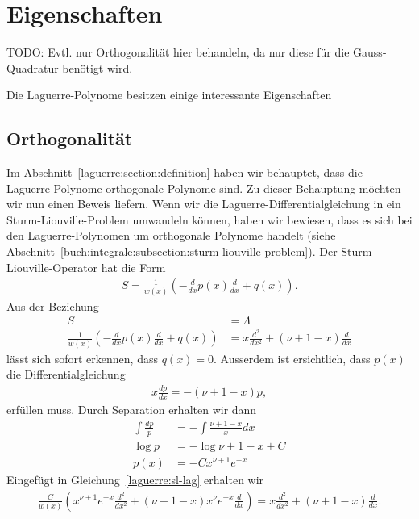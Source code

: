 %
%
%
\section{Eigenschaften
  \label{laguerre:section:eigenschaften}}
{
\large \color{red}
TODO:
Evtl. nur Orthogonalität hier behandeln, da nur diese für die Gauss-Quadratur
benötigt wird.
}

Die Laguerre-Polynome besitzen einige interessante Eigenschaften

\subsection{Orthogonalität
  \label{laguerre:subsection:orthogonal}}
Im Abschnitt~\ref{laguerre:section:definition} haben wir behauptet,
dass die Laguerre-Polynome orthogonale Polynome sind.
Zu dieser Behauptung möchten wir nun einen Beweis liefern.
Wenn wir die Laguerre\--Differentialgleichung in ein
Sturm\--Liouville\--Problem umwandeln können, haben wir bewiesen, dass es sich
bei
den Laguerre\--Polynomen um orthogonale Polynome handelt (siehe
Abschnitt~\ref{buch:integrale:subsection:sturm-liouville-problem}).
Der Sturm-Liouville-Operator hat die Form
\begin{align}
S
=
\frac{1}{w(x)} \left(-\frac{d}{dx}p(x) \frac{d}{dx} + q(x) \right).
\label{laguerre:slop}
\end{align}
Aus der Beziehung
\begin{align}
S
 & =
\Lambda
\nonumber
\\
\frac{1}{w(x)} \left(-\frac{d}{dx}p(x) \frac{d}{dx} + q(x) \right)
 & =
x \frac{d^2}{dx^2} + (\nu + 1 - x) \frac{d}{dx}
\label{laguerre:sl-lag}
\end{align}
lässt sich sofort erkennen, dass $q(x) = 0$.
Ausserdem ist ersichtlich, dass $p(x)$ die Differentialgleichung
\begin{align*}
x \frac{dp}{dx}
=
-(\nu + 1 - x) p,
\end{align*}
erfüllen muss.
Durch Separation erhalten wir dann
\begin{align*}
\int \frac{dp}{p}
 & =
-\int \frac{\nu + 1 - x}{x}dx
\\
\log p
 & =
-\log \nu + 1 - x + C
\\
p(x)
 & =
-C x^{\nu + 1} e^{-x}
\end{align*}
Eingefügt in Gleichung~\eqref{laguerre:sl-lag} erhalten wir
\begin{align*}
\frac{C}{w(x)}
\left(
x^{\nu+1} e^{-x} \frac{d^2}{dx^2} +
(\nu + 1 - x) x^{\nu} e^{-x} \frac{d}{dx}
\right)
=
x \frac{d^2}{dx^2} + (\nu + 1 - x) \frac{d}{dx}.
\end{align*}
